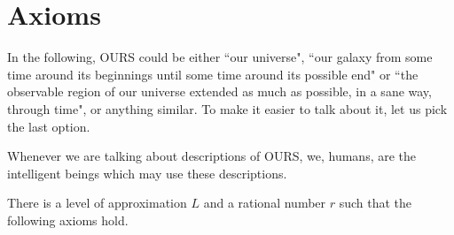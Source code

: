 \documentclass[a4paper
,draft
]{article}
\newcommand{\ghilimele}[1]{``#1"}
\begin{document}
\section{Axioms}

In the following, OURS could be either \ghilimele{our universe}, \ghilimele{our galaxy from some time around its beginnings until some time around its possible end} or \ghilimele{the observable region of our universe extended as much as possible, in a sane way, through time}, or anything similar. To make it easier to talk about it, let us pick the last option.

Whenever we are talking about descriptions of OURS, we, humans, are the intelligent beings which may use these descriptions.

There is a level of approximation $L$ and a rational number $r$ such that the following axioms hold.
\end{document}
